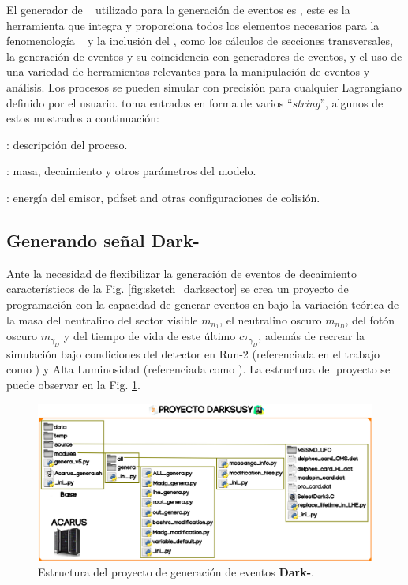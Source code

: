 El generador de \MC ~ utilizado para la generación de eventos es , este es la herramienta que integra y proporciona todos los elementos necesarios para la fenomenología \ME ~ y la inclusión del \SUSY, como los cálculos de secciones transversales, la generación de eventos y su coincidencia con generadores de eventos, y el uso de una variedad de herramientas relevantes para la manipulación de eventos y análisis. Los procesos se pueden simular con precisión para cualquier Lagrangiano definido por el usuario.  toma entradas en forma de varios ``\textit{string}'', algunos de estos mostrados a continuación:
\begin{itemize_f}
\item  {}: descripción del proceso.
\item  {}: masa, decaimiento y otros parámetros del modelo.
\item  {}: energía del emisor, pdfset and otras configuraciones de colisión.
\end{itemize_f}




\subsection{Generando señal \textbf{Dark-}\SUSY}

Ante la necesidad de flexibilizar la generación de eventos de decaimiento característicos de la Fig. \ref{fig:sketch_darksector} se crea un proyecto de programación con la capacidad de generar eventos en  bajo la variación teórica de la masa del neutralino del sector visible $m_{n_1}$, el neutralino oscuro $m_{n_D}$, del fotón oscuro $m_{\gamma_D}$ y del tiempo de vida de este último $c\tau_{\gamma_D}$, además de recrear la simulación bajo condiciones del detector en Run-2 (referenciada en el trabajo como ) y Alta Luminosidad (referenciada como ). La estructura del proyecto se puede observar en la Fig. \ref{genera_darksusy0}.

\begin{figure}[!ht]
\centering
\includegraphics[width=1\textwidth]{Cap3/imagenes/proyecto_darksusy.png}
\caption[Estructura del proyecto de generación de eventos \textbf{Dark-\SUSY}.]{Estructura del proyecto de generación de eventos \textbf{Dark-\SUSY}\footnotemark.}
\label{genera_darksusy0}
\end{figure}

